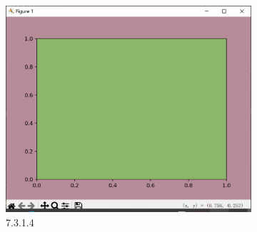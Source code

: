 \documentclass[12pt]{article}
\begin{document}
\begin{figure}[H]
    \centering
    \begin{subfigure}[b]{0.5\textwidth}
        \includegraphics[width=\textwidth]{React resize Pic1.png} %
        \caption{7.3.1.4}
        \label{fig:line-graph2}
    \end{subfigure}
    \hfill
    \begin{subfigure}[b]{0.15\textwidth}

\end{subfigure}
\end{figure}
\end{document}
